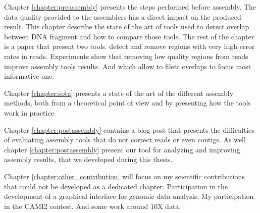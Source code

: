 \documentclass[./main.tex]{subfiles}
\begin{document}
Chapter \ref{chapter:preassembly} presents the steps performed before assembly. %
The  data quality  provided to the assemblers has a direct impact on the produced result.%
This chapter describe the state of the art of tools used to detect overlap between DNA fragment and how to compare those tools. %
The rest of the chapter is a paper that present two tools.%
\yacrd  detect and remove regions with very high error rates in reads.
Experiments show that removing  low quality regions from reads improve assembly tools results.%
And \fpa which allow to filetr overlaps to focus most informative one.

Chapter \ref{chapter:sota} presents a state of the art of the different assembly methods, both from a theoretical point of view and by presenting how the tools work in practice.

Chapter \ref{chapter:postassembly} contains a blog post that presents the difficulties of evaluating assembly tools that do not correct reads or even contigs. As well chapter \ref{chapter:postassembly} present our tool for analyzing and improving assembly results, \knot that we developed during this thesis.

Chapter \ref{chapter:other_contribution} will focus on my scientific contributions that could not be developed  as a dedicated chapter. 
Participation in the development of a graphical interface for genomic data analysis. My participation in the CAMI2 contest. And some work around 10X data.

\end{document}
